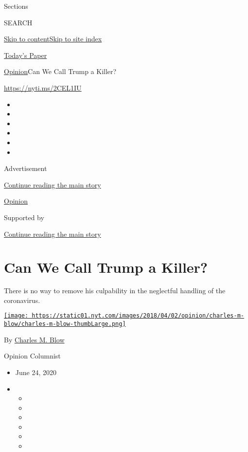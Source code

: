 Sections

SEARCH

\protect\hyperlink{site-content}{Skip to
content}\protect\hyperlink{site-index}{Skip to site index}

\href{https://myaccount.nytimes.com/auth/login?response_type=cookie\&client_id=vi}{}

\href{https://www.nytimes.com/section/todayspaper}{Today's Paper}

\href{/section/opinion}{Opinion}\textbar{}Can We Call Trump a Killer?

\href{https://nyti.ms/2CEL1IU}{https://nyti.ms/2CEL1IU}

\begin{itemize}
\item
\item
\item
\item
\item
\item
\end{itemize}

Advertisement

\protect\hyperlink{after-top}{Continue reading the main story}

\href{/section/opinion}{Opinion}

Supported by

\protect\hyperlink{after-sponsor}{Continue reading the main story}

\hypertarget{can-we-call-trump-a-killer}{%
\section{Can We Call Trump a Killer?}\label{can-we-call-trump-a-killer}}

There is no way to remove his culpability in the neglectful handling of
the coronavirus.

\href{https://www.nytimes.com/by/charles-m-blow}{\texttt{[image: https://static01.nyt.com/images/2018/04/02/opinion/charles-m-blow/charles-m-blow-thumbLarge.png]}}

By \href{https://www.nytimes.com/by/charles-m-blow}{Charles M. Blow}

Opinion Columnist

\begin{itemize}
\item
  June 24, 2020
\item
  \begin{itemize}
  \item
  \item
  \item
  \item
  \item
  \item
  \end{itemize}
\end{itemize}

